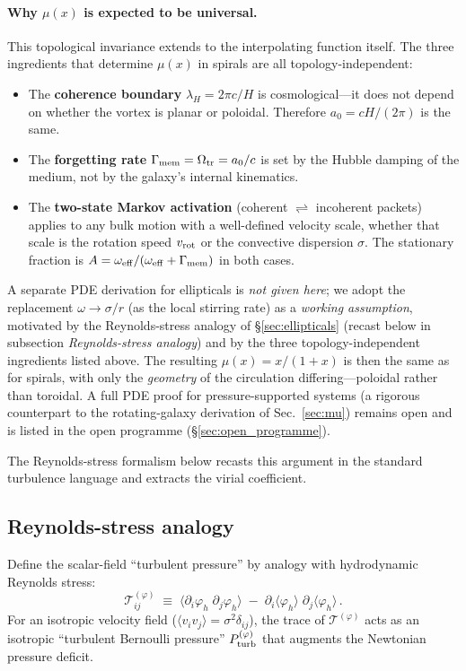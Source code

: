 \documentclass[11pt]{article}
\begin{document}
\paragraph{Why $\mu(x)$ is expected to be universal.}
This topological invariance extends to the interpolating function
itself.  The three ingredients that determine $\mu(x)$ in spirals
are all topology-independent:
\begin{itemize}
\item The \textbf{coherence boundary} $\lambda_H = 2\pi c/H$ is
  cosmological---it does not depend on whether the vortex is planar
  or poloidal.  Therefore $a_0 = cH/(2\pi)$ is the same.
\item The \textbf{forgetting rate}
  $\Gamma_{\rm mem}=\Omega_{\rm tr}=a_0/c$ is set by the Hubble
  damping of the medium, not by the galaxy's internal kinematics.
\item The \textbf{two-state Markov activation}
  (coherent $\rightleftharpoons$ incoherent packets) applies to any
  bulk motion with a well-defined velocity scale, whether that scale
  is the rotation speed $v_{\rm rot}$ or the convective dispersion
  $\sigma$.  The stationary fraction is
  $A = \omega_{\rm eff}/(\omega_{\rm eff}+\Gamma_{\rm mem})$
  in both cases.
\end{itemize}
\noindent A separate PDE derivation for ellipticals is
\emph{not given here}; we adopt the replacement
$\omega \to \sigma/r$ (as the local stirring rate) as a
\emph{working assumption}, motivated by the Reynolds-stress
analogy of §\ref{sec:ellipticals} (recast below in subsection
\emph{Reynolds-stress analogy}) and by the three topology-independent
ingredients listed above.  The resulting $\mu(x)=x/(1+x)$ is
then the same as for spirals, with only the \emph{geometry} of
the circulation differing---poloidal rather than toroidal.
A full PDE proof for pressure-supported systems (a rigorous
counterpart to the rotating-galaxy derivation of
Sec.~\ref{sec:mu}) remains open and is listed in the open
programme (§\ref{sec:open_programme}).

The Reynolds-stress formalism below recasts this argument in the
standard turbulence language and extracts the virial coefficient.

\subsection{Reynolds-stress analogy}

Define the scalar-field ``turbulent pressure'' by analogy with
hydrodynamic Reynolds stress:
\begin{equation}
  \mathcal{T}_{ij}^{(\varphi)}
  \;\equiv\;
  \bigl\langle \partial_i \varphi_h \;\partial_j \varphi_h \bigr\rangle
  \;-\;
  \partial_i\langle\varphi_h\rangle \;\partial_j\langle\varphi_h\rangle\,.
\label{eq:reynolds_phi}
\end{equation}
For an isotropic velocity field ($\langle v_i v_j \rangle = \sigma^2 \delta_{ij}$),
the trace of $\mathcal{T}^{(\varphi)}$ acts as an isotropic
``turbulent Bernoulli pressure'' $P_{\rm turb}^{(\varphi)}$ that augments
the Newtonian pressure deficit.
\end{document}
